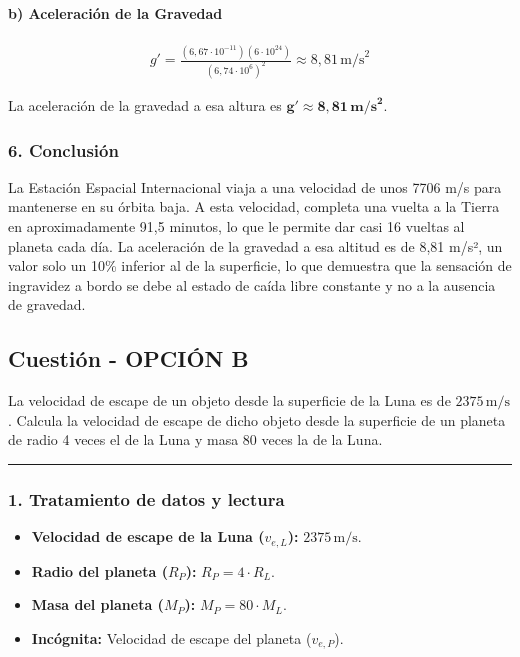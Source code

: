 \paragraph*{b) Aceleración de la Gravedad}
\begin{gather}
    g' = \frac{(6,67\cdot10^{-11})(6\cdot10^{24})}{(6,74 \cdot 10^6)^2} \approx 8,81\,\text{m/s}^2
\end{gather}
\begin{cajaresultado}
    La aceleración de la gravedad a esa altura es $\boldsymbol{g' \approx 8,81\,\textbf{m/s}^2}$.
\end{cajaresultado}

\subsubsection*{6. Conclusión}
\begin{cajaconclusion}
La Estación Espacial Internacional viaja a una velocidad de unos 7706 m/s para mantenerse en su órbita baja. A esta velocidad, completa una vuelta a la Tierra en aproximadamente 91,5 minutos, lo que le permite dar casi 16 vueltas al planeta cada día. La aceleración de la gravedad a esa altitud es de 8,81 m/s², un valor solo un 10\% inferior al de la superficie, lo que demuestra que la sensación de ingravidez a bordo se debe al estado de caída libre constante y no a la ausencia de gravedad.
\end{cajaconclusion}

\newpage

\subsection{Cuestión - OPCIÓN B}
\label{subsec:IB_2012_sep}

\begin{cajaenunciado}
La velocidad de escape de un objeto desde la superficie de la Luna es de $2375\,\text{m/s}$. Calcula la velocidad de escape de dicho objeto desde la superficie de un planeta de radio 4 veces el de la Luna y masa 80 veces la de la Luna.
\end{cajaenunciado}
\hrule

\subsubsection*{1. Tratamiento de datos y lectura}
\begin{itemize}
    \item \textbf{Velocidad de escape de la Luna ($v_{e,L}$):} $2375\,\text{m/s}$.
    \item \textbf{Radio del planeta ($R_P$):} $R_P = 4 \cdot R_L$.
    \item \textbf{Masa del planeta ($M_P$):} $M_P = 80 \cdot M_L$.
    \item \textbf{Incógnita:} Velocidad de escape del planeta ($v_{e,P}$).
\end{itemize}

